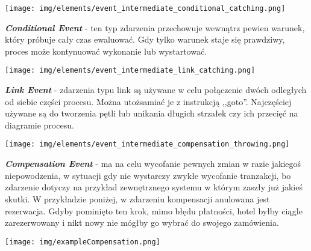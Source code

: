 \documentclass[declaration,shortabstract,mgr]{iithesis}
\begin{document}
\vspace{\mypointsep}

\noindent\begin{minipage}[t]{0.075\textwidth}\vspace{0pt}
\texttt{[image: img/elements/event\_intermediate\_conditional\_catching.png]}
\end{minipage}\hfill
\begin{minipage}[t]{0.875\textwidth}\vspace{0pt}
\textbf{\textit{Conditional Event}} - ten typ zdarzenia przechowuje wewnątrz pewien warunek, który próbuje cały czas ewaluować. Gdy tylko warunek staje się prawdziwy, proces może kontynuować wykonanie lub wystartować.
\end{minipage}

\vspace{\mypointsep}

\noindent\begin{minipage}[t]{0.075\textwidth}\vspace{0pt}
\texttt{[image: img/elements/event\_intermediate\_link\_catching.png]}
\end{minipage}\hfill
\begin{minipage}[t]{0.875\textwidth}\vspace{0pt}
\textbf{\textit{Link Event}} - zdarzenia typu link są używane w celu połączenie dwóch odległych od siebie części procesu. Można utożsamiać je z instrukcją ,,goto''. Najczęściej używane są do tworzenia pętli lub unikania długich strzałek czy ich przecięć na diagramie procesu.
\end{minipage}

\vspace{\mypointsep}

\noindent\begin{minipage}[t]{0.075\textwidth}\vspace{0pt}
\texttt{[image: img/elements/event\_intermediate\_compensation\_throwing.png]}
\end{minipage}\hfill
\begin{minipage}[t]{0.875\textwidth}\vspace{0pt}
\textbf{\textit{Compensation Event}} - ma na celu wycofanie pewnych zmian w razie jakiegoś niepowodzenia, w sytuacji gdy nie wystarczy
zwykłe wycofanie tranzakcji, bo zdarzenie dotyczy
na przykład zewnętrznego systemu w którym zaszły już jakieś
skutki. W przykładzie poniżej, w zdarzeniu kompensacji anulowana jest rezerwacja. Gdyby pominięto ten krok, mimo błędu płatności, hotel byłby ciągle zarezerwowany i nikt nowy nie mógłby go wybrać do swojego zamówienia.
\begin{center}
\texttt{[image: img/exampleCompensation.png]}
\end{center}
\end{minipage}
\end{document}
